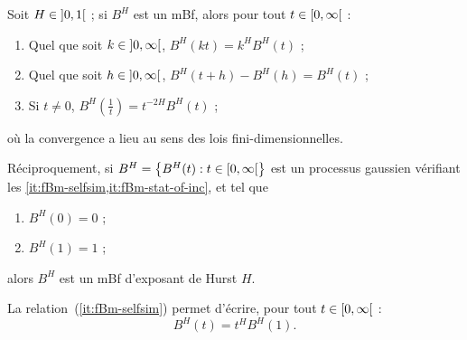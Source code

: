 \begin{proposition}
  Soit $H\in\left]0,1\right[$ ; si $B^H$ est un mBf, alors pour tout
  $t\in\left[0,\infty\right[$ :
  \begin{enumerate}
  \item\label{it:fBm-selfsim} Quel que soit $k\in\left]0,\infty\right[$,
    $B^H(kt) = k^HB^H(t)$ ;
  \item\label{it:fBm-stat-of-inc} Quel que soit
    $h\in\left]0,\infty\right[$, $B^H(t+h) - B^H(h) = B^H(t)$ ;
  \item\label{it:fBm-time-inversion} Si $t\neq 0$,
    $B^H(\frac{1}{t}) = t^{-2H}B^H(t)$ ;
  \end{enumerate}
  où la convergence a lieu au sens des lois fini-dimensionnelles.

  Réciproquement, si
  $B^H=\left\{B^H(t) : t\in\left[0,\infty\right[\right\}$ est un processus
  gaussien vérifiant les \cref{it:fBm-selfsim,it:fBm-stat-of-inc}, et
  tel que
  \begin{enumerate}[resume]
  \item $B^H(0)=0$ ;
  \item $B^H(1)=1$ ;
  \end{enumerate}
  alors $B^H$ est un mBf d'exposant de Hurst $H$.
\end{proposition}

\begin{remarque}
  \label{rk:fBm-selfsim-rephrase}
  La relation~(\ref{it:fBm-selfsim}) permet d'écrire, pour tout
  $t\in\left[0,\infty\right[$ : \[ B^H(t) = t^HB^H(1) .\]
\end{remarque}

